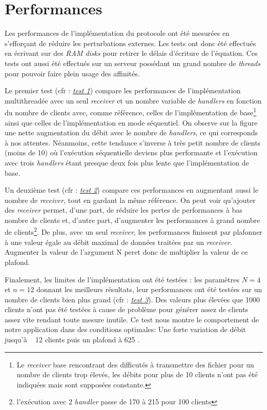 \documentclass[../main.tex]{subfiles}
\begin{document}
\section{Performances}
\label{sec:performances}

Les performances de l'implémentation du protocole ont été mesurées en s'efforçant de réduire les perturbations externes. Les tests ont donc été 
effectués en écrivant sur des \textit{RAM disks} pour retirer le délais d'écriture de l'équation. Ces tests ont aussi été effectués sur un serveur 
possédant un grand nombre de \textit{threads} pour pouvoir faire plein usage des affinités.

Le premier test (cfr : \hyperref[sec:plot_1_recv]{\textit{test 1}}) compare les performances de l'implémentation multithreadée avec un seul \textit{receiver} et un nombre variable de \textit{handlers} 
en fonction du nombre de clients avec, comme référence, celles de l'implémentation de base\footnote{Le \textit{receiver} base rencontrant des 
difficutés à transmettre des fichier pour un nombre de clients trop élevés, les débits pour plus de 10 clients n'ont pas été indiquées mais sont 
supposées constante.} ainsi que celles de l'implémentation en mode séquentiel.          %
On observe sur la figure une nette augmentation du débit avec le nombre de \textit{handlers}, ce qui corresponds à nos attentes. Néanmoins, cette 
tendance s'inverse à très petit nombre de clients (moins de 10) où l'exécution séquentielle deviens plus performante et l'exécution avec trois \textit{handlers} étant 
presque deux fois plus lente que l'implémentation de base.

Un deuxième test (cfr : \hyperref[sec:plot_mul_recv]{\textit{test 2}}) compare ces performances en augmentant aussi le nombre de \textit{receiver}, tout en gardant la même référence. On peut voir qu'ajouter 
des \textit{receiver} permet, d'une part, de réduire les pertes de performances à bas nombre de clients et, d'autre part, d'augmenter les performances à 
grand nombre de clients\footnote{l'exécution avec 2 \textit{handler} passe de 170  à 215 pour 100 clients}. De plus, avec un seul 
\textit{receiver}, les performances finissent par plafonner à une valeur égale au débit maximal de données traitées par un \textit{receiver}. Augmenter 
la valeur de l'argument N peret donc de multiplier la valeur de ce plafond.

Finalement, les limites de l'implémentation ont été testées : les paramètres $N = 4$ et $n = 12$ donnant les meilleurs résultats, leur performances ont été 
testées sur un nombre de clients bien plus grand (cfr : \hyperref[sec:plot_max]{\textit{test 3}}). Des valeurs plus élevées que 1000 clients n'ont pas été 
testées à cause de problème pour générer assez de clients assez vite rendant toute mesure inutile.
Ce test nous montre le comportement de notre application dans des conditions optimales: Une forte variation de débit jusqu'à ~ 12 clients puis un plafond à 625 .
\end{document}
